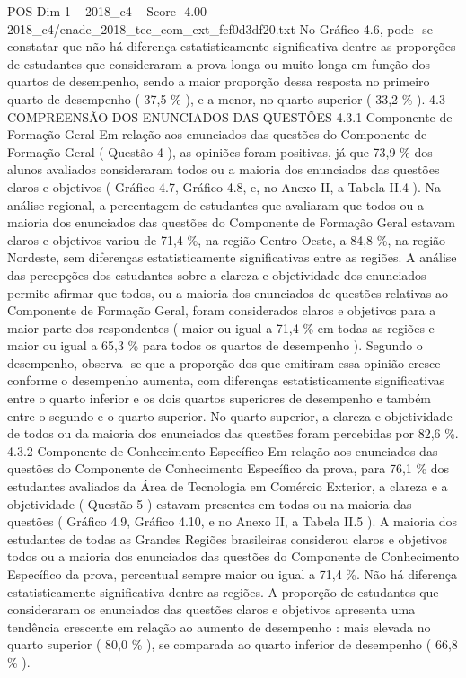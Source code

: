 \begin{textsample}{POS Dim 1 – 2018\_c4 – Score -4.00 – 2018\_c4/enade\_2018\_tec\_com\_ext\_fef0d3df20.txt}
No Gráfico 4.6, pode -se constatar que não há diferença estatisticamente significativa dentre as proporções de estudantes que consideraram a prova longa ou muito longa em função dos quartos de desempenho, sendo a maior proporção dessa resposta no primeiro quarto de desempenho ( 37,5 \% ), e a menor, no quarto superior ( 33,2 \% ). 4.3 COMPREENSÃO DOS ENUNCIADOS DAS QUESTÕES 4.3.1 Componente de Formação Geral Em relação aos enunciados das questões do Componente de Formação Geral ( Questão 4 ), as opiniões foram positivas, já que 73,9 \% dos alunos avaliados consideraram todos ou a maioria dos enunciados das questões claros e objetivos ( Gráfico 4.7, Gráfico 4.8, e, no Anexo II, a Tabela II.4 ).
Na análise regional, a percentagem de estudantes que avaliaram que todos ou a maioria dos enunciados das questões do Componente de Formação Geral estavam claros e objetivos variou de 71,4 \%, na região Centro-Oeste, a 84,8 \%, na região Nordeste, sem diferenças estatisticamente significativas entre as regiões.
A análise das percepções dos estudantes sobre a clareza e objetividade dos enunciados permite afirmar que todos, ou a maioria dos enunciados de questões relativas ao Componente de Formação Geral, foram considerados claros e objetivos para a maior parte dos respondentes ( maior ou igual a 71,4 \% em todas as regiões e maior ou igual a 65,3 \% para todos os quartos de desempenho ).
Segundo o desempenho, observa -se que a proporção dos que emitiram essa opinião cresce conforme o desempenho aumenta, com diferenças estatisticamente significativas entre o quarto inferior e os dois quartos superiores de desempenho e também entre o segundo e o quarto superior.
No quarto superior, a clareza e objetividade de todos ou da maioria dos enunciados das questões foram percebidas por 82,6 \%. 4.3.2 Componente de Conhecimento Específico Em relação aos enunciados das questões do Componente de Conhecimento Específico da prova, para 76,1 \% dos estudantes avaliados da Área de Tecnologia em Comércio Exterior, a clareza e a objetividade ( Questão 5 ) estavam presentes em todas ou na maioria das questões ( Gráfico 4.9, Gráfico 4.10, e no Anexo II, a Tabela II.5 ).
A maioria dos estudantes de todas as Grandes Regiões brasileiras considerou claros e objetivos todos ou a maioria dos enunciados das questões do Componente de Conhecimento Específico da prova, percentual sempre maior ou igual a 71,4 \%.
Não há diferença estatisticamente significativa dentre as regiões.
A proporção de estudantes que consideraram os enunciados das questões claros e objetivos apresenta uma tendência crescente em relação ao aumento de desempenho : mais elevada no quarto superior ( 80,0 \% ), se comparada ao quarto inferior de desempenho ( 66,8 \% ).

\end{textsample}
